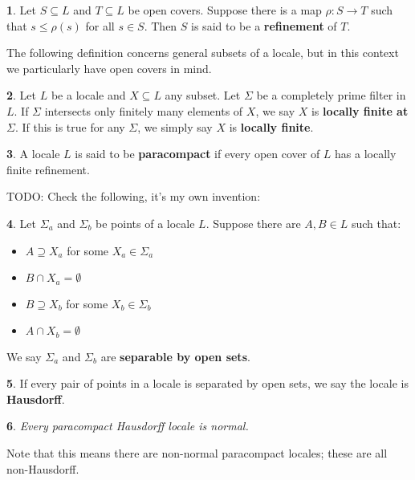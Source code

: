 \documentclass[oneside,english]{amsbook}
\numberwithin{section}{chapter}
\theoremstyle{plain}
\newtheorem{thm}{\protect\theoremname}
\theoremstyle{definition}
\newtheorem{defn}[thm]{\protect\definitionname}
\providecommand{\definitionname}{Definition}
\providecommand{\theoremname}{Theorem}
\begin{document}
\begin{defn}
	Let $S\subseteq L$ and $T\subseteq L$ be open covers. Suppose there is a map $\rho:S\to T$ such that $s\le \rho(s)$ for all $s\in S$. Then $S$ is said to be a \textbf{refinement} of $T$.
\end{defn}

The following definition concerns general subsets of a locale, but in this context we particularly have open covers in mind.

\begin{defn}
	Let $L$ be a locale and $X\subseteq L$ any subset. Let $\Sigma$ be a completely prime filter in $L$. If $\Sigma$ intersects only finitely many elements of $X$, we say $X$ is \textbf{locally finite at $\Sigma$}. If this is true for any $\Sigma$, we simply say $X$ is \textbf{locally finite}.
\end{defn}

\begin{defn}A locale $L$ is said to be \textbf{paracompact} if every open cover of $L$ has a locally finite refinement.
\end{defn}

TODO: Check the following, it's my own invention:

\begin{defn}Let $\Sigma_a$ and $\Sigma_b$ be points of a locale $L$. Suppose there are $A, B\in L$ such that:
	\begin{itemize}
		\item{$A \supseteq X_a$ for some $X_a\in \Sigma_a$}
		\item{$B \cap X_a = \emptyset$}
		\item{$B \supseteq X_b$ for some $X_b\in \Sigma_b$}
		\item{$A \cap X_b = \emptyset$}
	\end{itemize} 	
	We say $\Sigma_a$ and $\Sigma_b$ are \textbf{separable by open sets}.
\end{defn}

\begin{defn}
	If every pair of points in a locale is separated by open sets, we say the locale is \textbf{Hausdorff}.
\end{defn}

\begin{thm}
	Every paracompact Hausdorff locale is normal.
\end{thm}

Note that this means there are non-normal paracompact locales; these are all non-Hausdorff.
\end{document}
